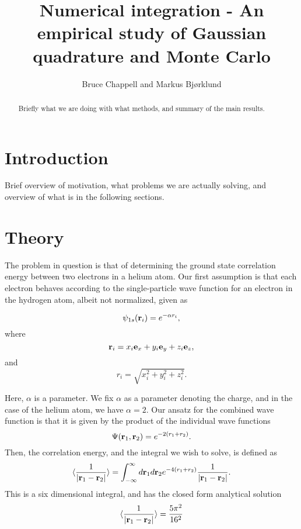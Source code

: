 \documentclass{emulateapj}
\begin{document}
\title{Numerical integration - An empirical study of Gaussian quadrature and Monte Carlo}

\author{Bruce Chappell and Markus Bjørklund}



\begin{abstract}

Briefly what we are doing with what methods, and summary of the main results.

\end{abstract}

\section{Introduction}
\label{sec:introduction}
Brief overview of motivation, what problems we are actually solving, and overview of what is in the following sections.


\section{Theory}
\label{sec:method}
The problem in question is that of determining the ground state correlation energy between two electrons in a helium atom. Our first assumption is that each electron behaves according to the single-particle wave function for an electron in the hydrogen atom, albeit not normalized, given as

\[
   \psi_{1s}({\bf r}_i)  =   e^{-\alpha r_i},
\]
where
\[
   {\bf r}_i =  x_i {\bf e}_x + y_i {\bf e}_y +z_i {\bf e}_z ,
\]
and
\[
r_i = \sqrt{x_i^2+y_i^2+z_i^2}.
\]

Here, $\alpha$ is a parameter. We fix $\alpha$ as a parameter denoting the charge, and in the case of the helium atom, we have $\alpha = 2$. Our ansatz for the combined wave function is that it is given by the product of the individual wave functions
\[
   \Psi({\bf r}_1,{\bf r}_2)  =   e^{-2 (r_1+r_2)}.
\]
Then, the correlation energy, and the integral we wish to solve, is defined as
\begin{equation}\label{eq:correlationenergy}
   \langle \frac{1}{|{\bf r}_1-{\bf r}_2|} \rangle =
   \int_{-\infty}^{\infty} d{\bf r}_1d{\bf r}_2  e^{-4 (r_1+r_2)}\frac{1}{|{\bf r}_1-{\bf r}_2|}.
\end{equation}
This is a six dimensional integral, and has the closed form analytical solution
\[
\langle \frac{1}{|{\bf r}_1-{\bf r}_2|} \rangle = \frac{5\pi^2}{16^2}
\]
\end{document}
